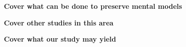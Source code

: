 \textbf{Cover what can be done to preserve mental models}

\textbf{Cover other studies in this area}

\textbf{Cover what our study may yield}


% 
% 
% 
% 
% 


% 

